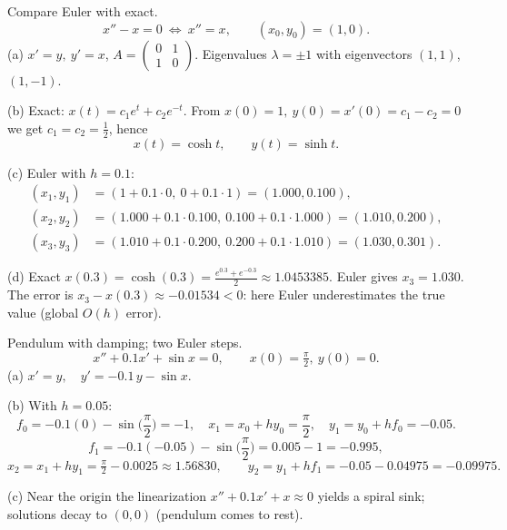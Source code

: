 \documentclass[11pt]{article}
\def\textbf#1{#1}%
\def\mathbf#1{#1}%
\begin{document}
\begin{solution}
\textbf{Compare Euler with exact.}
\[
x''-x=0\ \Longleftrightarrow\ x''=x,\qquad (x_0,y_0)=(1,0).
\]
(a) \(x'=y,\ y'=x\), \(A=\begin{pmatrix}0&1\\1&0\end{pmatrix}\).
Eigenvalues \(\lambda=\pm1\) with eigenvectors \((1,1)\), \((1,-1)\).

(b) Exact: \(x(t)=c_1 e^{t}+c_2 e^{-t}\).
From \(x(0)=1,\ y(0)=x'(0)=c_1-c_2=0\) we get \(c_1=c_2=\tfrac12\), hence
\[
\boxed{x(t)=\cosh t},\qquad y(t)=\sinh t.
\]

(c) Euler with \(h=0.1\):
\[
\begin{aligned}
(x_1,y_1)&=(1+0.1\cdot0,\ 0+0.1\cdot1)=(1.000,0.100),\\
(x_2,y_2)&=(1.000+0.1\cdot0.100,\ 0.100+0.1\cdot1.000)=(1.010,0.200),\\
(x_3,y_3)&=(1.010+0.1\cdot0.200,\ 0.200+0.1\cdot1.010)=(1.030,0.301).
\end{aligned}
\]

(d) Exact \(x(0.3)=\cosh(0.3)=\tfrac{e^{0.3}+e^{-0.3}}{2}\approx \mathbf{1.0453385}\).
Euler gives \(x_3=1.030\). The error is \(x_3-x(0.3)\approx -0.01534<0\): here Euler \textbf{underestimates} the true value (global \(O(h)\) error).
\end{solution}

\begin{solution}
\textbf{Pendulum with damping; two Euler steps.}
\[
x''+0.1x'+\sin x=0,\qquad x(0)=\tfrac{\pi}{2},\ y(0)=0.
\]
(a) \(x'=y,\quad y'=-0.1\,y-\sin x.\)

(b) With \(h=0.05\):
\[
f_0=-0.1(0)-\sin\!\Big(\frac{\pi}{2}\Big)=-1,\quad
x_1=x_0+h y_0=\frac{\pi}{2},\quad y_1=y_0+h f_0=-0.05.
\]
\[
f_1=-0.1(-0.05)-\sin\!\Big(\frac{\pi}{2}\Big)=0.005-1=-0.995,
\]
\[
\boxed{x_2=x_1+h y_1=\tfrac{\pi}{2}-0.0025\approx 1.56830},\qquad
\boxed{y_2=y_1+h f_1=-0.05-0.04975=-0.09975}.
\]

(c) Near the origin the linearization \(x''+0.1x'+x\approx0\) yields a spiral sink; solutions decay to \((0,0)\) (pendulum comes to rest).
\end{solution}
\end{document}
